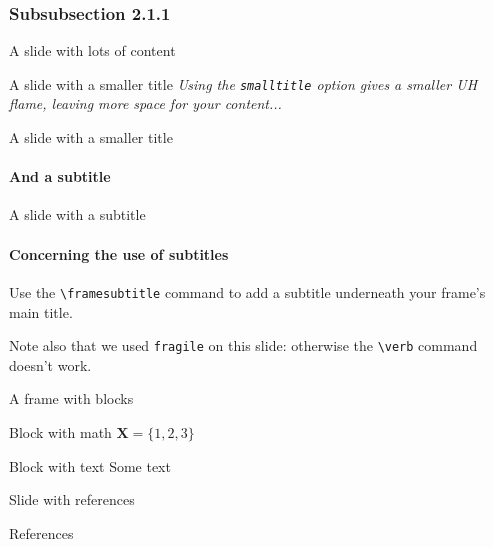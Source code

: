 \documentclass[12pt, t]{beamer}
\begin{document}
\subsubsection{Subsubsection 2.1.1}

\begin{frame}{A slide with lots of content}
    \lipsum[2]
\end{frame}

\begin{frame}[smalltitle]{A slide with a smaller title}
  \textit{Using the \texttt{smalltitle} option gives a smaller UH flame,
  leaving more space for your content...}

  \vspace{10pt}

  \lipsum[4]
\end{frame}

\begin{frame}[smalltitle]{A slide with a smaller title}
	\framesubtitle{And a subtitle}

  	\lipsum[4]
\end{frame}

\begin{frame}[fragile]{A slide with a subtitle}
  \framesubtitle{Concerning the use of subtitles}

  Use the \verb#\framesubtitle# command to add a subtitle
  underneath your frame's main title.

  \vfill

  Note also that we used \verb#fragile# on this slide: otherwise
  the \verb#\verb# command doesn't work.
\end{frame}

\begin{frame}[c]{A frame with blocks}
	\begin{block}{Block with math}
		$\mathbf{X} = \{1, 2, 3\}$
	\end{block}
	\begin{block}{Block with text}
		Some text
	\end{block}
\end{frame}

\begin{frame}{Slide with references}
	\centering \cite{upper1974unsuccessful, didden2007multisite}
\end{frame}

\begin{frame}[allowframebreaks]{References}
\end{frame}
\end{document}
